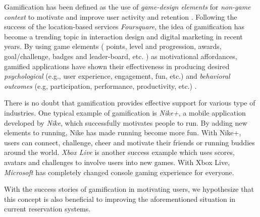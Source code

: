 Gamification has been defined as the use of \emph{game-design elements} for \emph{non-game context} to motivate and improve user activity and retention \cite{deterding2011game, hamari2014does}. Following the success of the location-based services \emph{Foursquare}, the idea of gamification has become a trending topic in interaction design and digital marketing \cite{deterding2011game} in recent years. By using game elements ( points, level and progression, awards, goal/challenge, badges and leader-board, etc. ) as motivational affordances, gamified applications have shown their effectiveness in producing desired \emph{psychological} (e.g., user experience, engagement, fun, etc.) and \emph{behavioral outcomes} (e.g, participation, performance, productivity, etc.) \cite{deterding2011game}. 

There is no doubt that gamification provides effective support for various type of industries. One typical example of gamification  is \emph{Nike+}, a mobile application developed by \emph{Nike}, which successfully motivates people to run. By adding new elements to running, Nike has made running become more fun. With Nike+, users can connect, challenge, cheer and motivate their friends or running buddies around the world. \emph{Xbox Live} is another success example which uses scores, avatars and challenges to involve users into new games. With Xbox Live, \emph{Microsoft} has completely changed console gaming experience for everyone.
 
With the success stories of gamification in motivating users, we hypothesize that this concept is also beneficial to improving the aforementioned situation in current reservation systems.